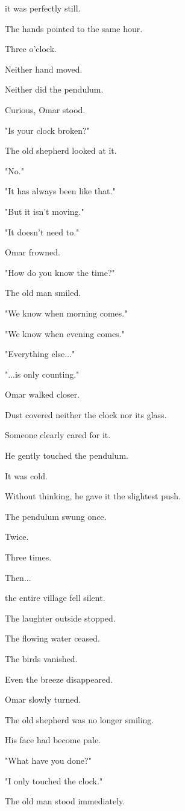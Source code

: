 \documentclass[12pt,openany]{book}
\begin{document}
it was perfectly still.

The hands pointed to the same hour.

Three o'clock.

Neither hand moved.

Neither did the pendulum.

Curious, Omar stood.

"Is your clock broken?"

The old shepherd looked at it.

"No."

"It has always been like that."

"But it isn't moving."

"It doesn't need to."

Omar frowned.

"How do you know the time?"

The old man smiled.

"We know when morning comes."

"We know when evening comes."

"Everything else..."

"...is only counting."

Omar walked closer.

Dust covered neither the clock nor its glass.

Someone clearly cared for it.

He gently touched the pendulum.

It was cold.

Without thinking, he gave it the slightest push.

The pendulum swung once.

Twice.

Three times.

Then...

the entire village fell silent.

The laughter outside stopped.

The flowing water ceased.

The birds vanished.

Even the breeze disappeared.

Omar slowly turned.

The old shepherd was no longer smiling.

His face had become pale.

"What have you done?"

"I only touched the clock."

The old man stood immediately.
\end{document}
